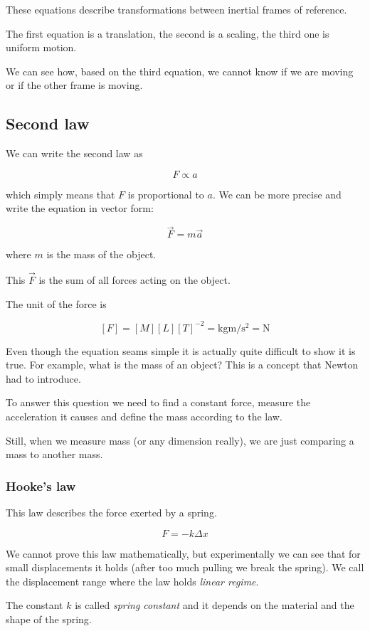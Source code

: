 \documentclass[10pt]{extarticle}
\begin{document}
These equations describe transformations between inertial frames of reference.

The first equation is a translation, the second is a scaling, the third one is uniform motion.

We can see how, based on the third equation, we cannot know if we are moving or if the other frame is moving.

\subsection{Second law}

We can write the second law as

$$
  F \propto a
$$

which simply means that $F$ is proportional to $a$.
We can be more precise and write the equation in vector form:

$$
  \vec F = m \vec a
$$

where $m$ is the mass of the object.

This $\vec F$ is the sum of all forces acting on the object.

The unit of the force is

$$
  [F] = [M][L][T]^{-2} = \si{\kilogram \meter \per \second \squared} = \si{\newton}
$$

Even though the equation seams simple it is actually quite difficult to show it is true.
For example, what is the mass of an object? This is a concept that Newton had to introduce.

To answer this question we need to find a constant force, measure the acceleration it causes and define the mass according to the law.

Still, when we measure mass (or any dimension really), we are just comparing a mass to another mass.

\subsubsection{Hooke's law}

This law describes the force exerted by a spring.

$$
  F = - k \Delta x
$$

We cannot prove this law mathematically, but experimentally we can see that for small displacements it holds (after too much pulling we break the spring).
We call the displacement range where the law holds \textit{linear regime}.

The constant $k$ is called \textit{spring constant} and it depends on the material and the shape of the spring.
\end{document}
